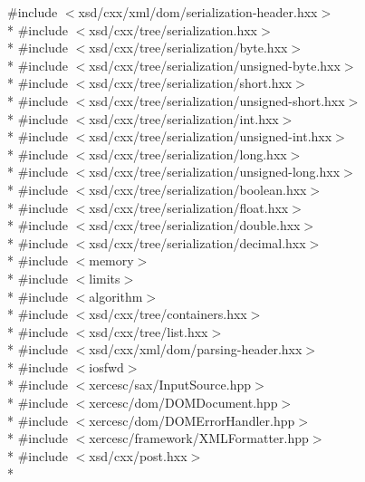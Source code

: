 {\ttfamily \#include $<$xsd/cxx/xml/dom/serialization-\/header.\+hxx$>$}\\*
{\ttfamily \#include $<$xsd/cxx/tree/serialization.\+hxx$>$}\\*
{\ttfamily \#include $<$xsd/cxx/tree/serialization/byte.\+hxx$>$}\\*
{\ttfamily \#include $<$xsd/cxx/tree/serialization/unsigned-\/byte.\+hxx$>$}\\*
{\ttfamily \#include $<$xsd/cxx/tree/serialization/short.\+hxx$>$}\\*
{\ttfamily \#include $<$xsd/cxx/tree/serialization/unsigned-\/short.\+hxx$>$}\\*
{\ttfamily \#include $<$xsd/cxx/tree/serialization/int.\+hxx$>$}\\*
{\ttfamily \#include $<$xsd/cxx/tree/serialization/unsigned-\/int.\+hxx$>$}\\*
{\ttfamily \#include $<$xsd/cxx/tree/serialization/long.\+hxx$>$}\\*
{\ttfamily \#include $<$xsd/cxx/tree/serialization/unsigned-\/long.\+hxx$>$}\\*
{\ttfamily \#include $<$xsd/cxx/tree/serialization/boolean.\+hxx$>$}\\*
{\ttfamily \#include $<$xsd/cxx/tree/serialization/float.\+hxx$>$}\\*
{\ttfamily \#include $<$xsd/cxx/tree/serialization/double.\+hxx$>$}\\*
{\ttfamily \#include $<$xsd/cxx/tree/serialization/decimal.\+hxx$>$}\\*
{\ttfamily \#include $<$memory$>$}\\*
{\ttfamily \#include $<$limits$>$}\\*
{\ttfamily \#include $<$algorithm$>$}\\*
{\ttfamily \#include $<$xsd/cxx/tree/containers.\+hxx$>$}\\*
{\ttfamily \#include $<$xsd/cxx/tree/list.\+hxx$>$}\\*
{\ttfamily \#include $<$xsd/cxx/xml/dom/parsing-\/header.\+hxx$>$}\\*
{\ttfamily \#include $<$iosfwd$>$}\\*
{\ttfamily \#include $<$xercesc/sax/\+Input\+Source.\+hpp$>$}\\*
{\ttfamily \#include $<$xercesc/dom/\+D\+O\+M\+Document.\+hpp$>$}\\*
{\ttfamily \#include $<$xercesc/dom/\+D\+O\+M\+Error\+Handler.\+hpp$>$}\\*
{\ttfamily \#include $<$xercesc/framework/\+X\+M\+L\+Formatter.\+hpp$>$}\\*
{\ttfamily \#include $<$xsd/cxx/post.\+hxx$>$}\\*
